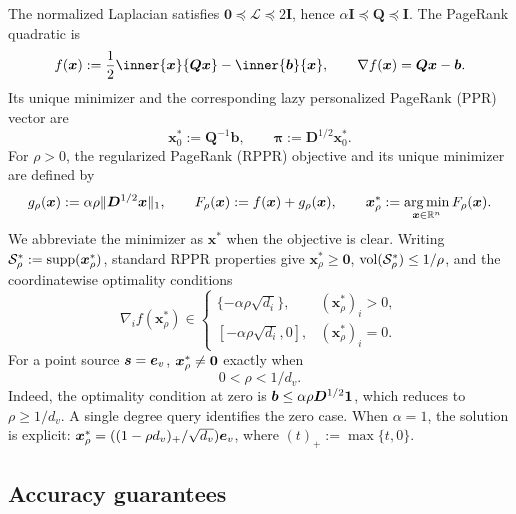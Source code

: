 The normalized Laplacian satisfies
\(\bm{0}\preceq\bm{\mathcal L}\preceq2\bm{I}\), hence
\(\alpha\bm{I}\preceq\bm{Q}\preceq\bm{I}\). The PageRank quadratic is
\begin{equation}
    f(\bm{x}):=\frac12\inner{\bm{x}}{\bm{Q}\bm{x}}-\inner{\bm{b}}{\bm{x}},
    \qquad
    \nabla f(\bm{x})=\bm{Q}\bm{x}-\bm{b}.
    \label{eq:shared-pagerank-objective}
\end{equation}
Its unique minimizer and the corresponding lazy personalized PageRank
(PPR) vector are
\begin{equation*}
    \bm{x}_0^*:=\bm{Q}^{-1}\bm{b},
    \qquad
    \bm{\pi}:=\bm{D}^{1/2}\bm{x}_0^*.
\end{equation*}
For \(\rho>0\), the regularized PageRank (RPPR) objective and its unique
minimizer are defined by
\begin{equation}
    g_\rho(\bm{x}):=\alpha\rho\lVert\bm{D}^{1/2}\bm{x}\rVert_1,
    \qquad
    F_\rho(\bm{x}):=f(\bm{x})+g_\rho(\bm{x}),
    \qquad
    \bm{x}_\rho^*:=\operatorname*{arg\,min}_{\bm{x}\in\mathbb{R}^n}F_\rho(\bm{x}).
    \label{eq:shared-rppr-objective}
\end{equation}
We abbreviate the minimizer as \(\bm{x}^*\) when the objective is clear.
Writing \(\mathcal{S}_\rho^*:=\operatorname{supp}(\bm{x}_\rho^*)\), standard RPPR
properties give \(\bm{x}_\rho^*\geq\bm{0}\),
\(\operatorname{vol}(\mathcal{S}_\rho^*)\leq1/\rho\), and the coordinatewise
optimality conditions
\begin{equation}
    \nabla_i f(\bm{x}_\rho^*)
    \in
    \begin{cases}
        \{-\alpha\rho\sqrt{d_i}\}, & (\bm{x}_\rho^*)_i>0,\\
        [-\alpha\rho\sqrt{d_i},0], & (\bm{x}_\rho^*)_i=0.
    \end{cases}
    \label{eq:shared-rppr-kkt}
\end{equation}
For a point source $\bm{s}=\bm{e}_{v}$, $\bm{x}_\rho^*\neq\bm{0}$ exactly when
\begin{equation}
 0<\rho<1/d_v.
 \label{eq:nonzero-rppr-regime}
\end{equation}
Indeed, the optimality condition at zero is
$\bm{b}\leq\alpha\rho\bm{D}^{1/2}\mathbf{1}$, which reduces to $\rho\geq1/d_v$.
A single degree query identifies the zero case. When $\alpha=1$, the
solution is explicit:
$\bm{x}_\rho^*=((1-\rho d_v)_+/\sqrt{d_v})\bm{e}_{v}$, where
$(t)_+:=\max\{t,0\}$.

\subsection{Accuracy guarantees}

